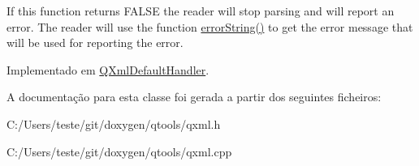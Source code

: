 If this function returns F\-A\-L\-S\-E the reader will stop parsing and will report an error. The reader will use the function \hyperlink{class_q_xml_decl_handler_ac86bbbabef3a52aec7615cbbc0adb3f4}{error\-String()} to get the error message that will be used for reporting the error. 

Implementado em \hyperlink{class_q_xml_default_handler_a89792dd1b272b7f45bebb8f1eda7ee99}{Q\-Xml\-Default\-Handler}.



A documentação para esta classe foi gerada a partir dos seguintes ficheiros\-:\begin{DoxyCompactItemize}
\item 
C\-:/\-Users/teste/git/doxygen/qtools/qxml.\-h\item 
C\-:/\-Users/teste/git/doxygen/qtools/qxml.\-cpp\end{DoxyCompactItemize}
